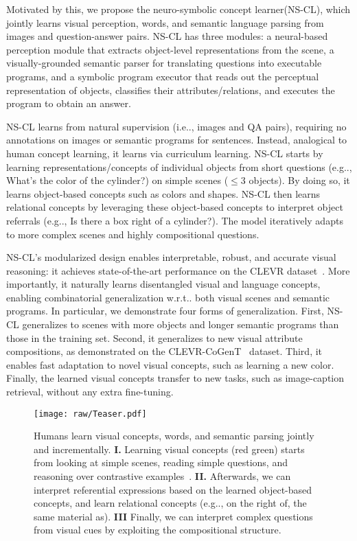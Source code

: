 \documentclass{article} \usepackage{iclr2019_conference,times}
\makeatletter
\def\vs{{\bm{s}}}
\DeclareRobustCommand\onedot{\futurelet\@let@token\@onedot}
\def\@onedot{\ifx\@let@token.\else.\null\fi\xspace}
\def\eg{e.g\onedot} \def\Eg{E.g\onedot}
\def\ie{i.e\onedot} \def\Ie{I.e\onedot}
\def\wrt{w.r.t\onedot} \def\dof{d.o.f\onedot}
\newcommand{\modelfull}{neuro-symbolic concept learner\xspace}
\newcommand{\model}{NS-CL\xspace}
\makeatother
\begin{document}
Motivated by this, we propose the \modelfull (\model), which jointly learns visual perception, words, and semantic language parsing from images and question-answer pairs. \model has three modules: a neural-based perception module that extracts object-level representations from the scene, a visually-grounded semantic parser for translating questions into executable programs, and a symbolic program executor that reads out the perceptual representation of objects, classifies their attributes/relations, and executes the program to obtain an answer.


\model learns from natural supervision (\ie, images and QA pairs), requiring no annotations on images or semantic programs for sentences. Instead, analogical to human concept learning, it learns via curriculum learning. \model starts by learning representations/concepts of individual objects from short questions (\eg, What's the color of the cylinder?) on simple scenes ($\leq$3 objects). By doing so, it learns object-based concepts such as colors and shapes. \model then learns relational concepts by leveraging these object-based concepts to interpret object referrals (\eg, Is there a box right of a cylinder?). The model iteratively adapts to more complex scenes and highly compositional questions. 





\model's modularized design enables interpretable, robust, and accurate visual reasoning: it achieves state-of-the-art performance on the CLEVR dataset~\citep{Johnson2017CLEVR}. More importantly, it naturally learns disentangled visual and language concepts, enabling combinatorial generalization \wrt both visual scenes and semantic programs. In particular, we demonstrate four forms of generalization. First, \model generalizes to scenes with more objects and longer semantic programs than those in the training set. Second, it generalizes to new visual attribute compositions, as demonstrated on the CLEVR-CoGenT~\citep{Johnson2017CLEVR} dataset. Third, it enables fast adaptation to novel visual concepts, such as learning a new color. Finally, the learned visual concepts transfer to new tasks, such as image-caption retrieval, without any extra fine-tuning.



\begin{figure}[t]
\centering
\texttt{[image: raw/Teaser.pdf]}
\caption{Humans learn visual concepts, words, and semantic parsing jointly and incrementally. {\bf I.} Learning visual concepts (red \vs green) starts from looking at simple scenes, reading simple questions, and reasoning over contrastive examples~\citep{fazly2010probabilistic}. {\bf II.} Afterwards, we can interpret referential expressions based on the learned object-based concepts, and learn relational concepts (\eg, on the right of, the same material as). {\bf III} Finally, we can interpret complex questions from visual cues by exploiting the compositional structure.}
\label{fig:teaser}
\vspace{-5pt}
\end{figure}
\end{document}

